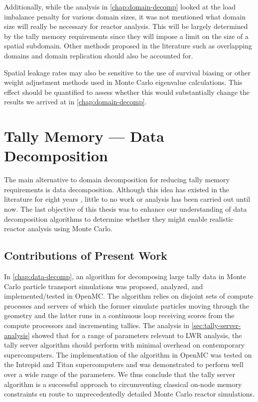 Additionally, while the analysis in \autoref{chap:domain-decomp} looked at the
load imbalance penalty for various domain sizes, it was not mentioned what
domain size will really be necessary for reactor analysis. This will be largely
determined by the tally memory requirements since they will impose a limit on
the size of a spatial subdomain. Other methods proposed in the literature such
as overlapping domains and domain replication should also be accounted for.

Spatial leakage rates may also be sensitive to the use of survival biasing or
other weight adjustment methods used in Monte Carlo eigenvalue
calculations. This effect should be quantified to assess whether this would
substantially change the results we arrived at in \autoref{chap:domain-decomp}.

\section{Tally Memory --- Data Decomposition}

The main alternative to domain decomposition for reducing tally memory
requirements is data decomposition. Although this idea has existed in the
literature for eight years \cite{trans-brown-2004}, little to no work or
analysis has been carried out until now. The last objective of this thesis was
to enhance our understanding of data decomposition algorithms to determine
whether they might enable realistic reactor analysis using Monte Carlo.

\subsection{Contributions of Present Work}

In \autoref{chap:data-decomp}, an algorithm for decomposing large tally data in
Monte Carlo particle transport simulations was proposed, analyzed, and
implemented/tested in OpenMC. The algorithm relies on disjoint sets of compute
processes and servers of which the former simulate particles moving through the
geometry and the latter runs in a continuous loop receiving scores from the
compute processors and incrementing tallies. The analysis in
\autoref{sec:tally-server-analysis} showed that for a range of parameters
relevant to LWR analysis, the tally server algorithm should perform with minimal
overhead on contemporary supercomputers. The implementation of the algorithm in
OpenMC was tested on the Intrepid and Titan supercomputers and was demonstrated
to perform well over a wide range of the parameters. We thus conclude that the
tally server algorithm is a successful approach to circumventing classical
on-node memory constraints en route to unprecedentedly detailed Monte Carlo
reactor simulations.

